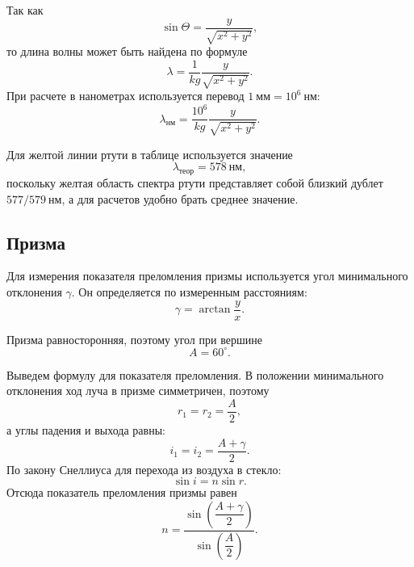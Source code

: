 \documentclass[a4paper,12pt]{article}
\begin{document}
Так как
\begin{equation}
    \sin\Theta = \frac{y}{\sqrt{x^2+y^2}},
\end{equation}
то длина волны может быть найдена по формуле
\begin{equation}
    \lambda = \frac{1}{kg}\frac{y}{\sqrt{x^2+y^2}}.
    \label{eq:lambda}
\end{equation}
При расчете в нанометрах используется перевод $1~\text{мм}=10^6~\text{нм}$:
\begin{equation}
    \lambda_{\text{нм}} = \frac{10^6}{kg}\frac{y}{\sqrt{x^2+y^2}}.
    \label{eq:lambda_nm}
\end{equation}

Для желтой линии ртути в таблице используется значение
\begin{equation}
    \lambda_{\text{теор}} = 578~\text{нм},
\end{equation}
поскольку желтая область спектра ртути представляет собой близкий дублет $577/579~\text{нм}$, а для расчетов удобно брать среднее значение.

\subsection{Призма}

Для измерения показателя преломления призмы используется угол минимального отклонения $\gamma$. Он определяется по измеренным расстояниям:
\begin{equation}
    \gamma = \arctan\frac{y}{x}.
    \label{eq:gamma}
\end{equation}

Призма равносторонняя, поэтому угол при вершине
\begin{equation}
    A = 60^\circ.
\end{equation}

Выведем формулу для показателя преломления. В положении минимального отклонения ход луча в призме симметричен, поэтому
\begin{equation}
    r_1 = r_2 = \frac{A}{2},
\end{equation}
а углы падения и выхода равны:
\begin{equation}
    i_1=i_2=\frac{A+\gamma}{2}.
\end{equation}
По закону Снеллиуса для перехода из воздуха в стекло:
\begin{equation}
    \sin i = n\sin r.
\end{equation}
Отсюда показатель преломления призмы равен
\begin{equation}
    n = \frac{\sin\left(\dfrac{A+\gamma}{2}\right)}{\sin\left(\dfrac{A}{2}\right)}.
    \label{eq:n_prism}
\end{equation}
\end{document}
